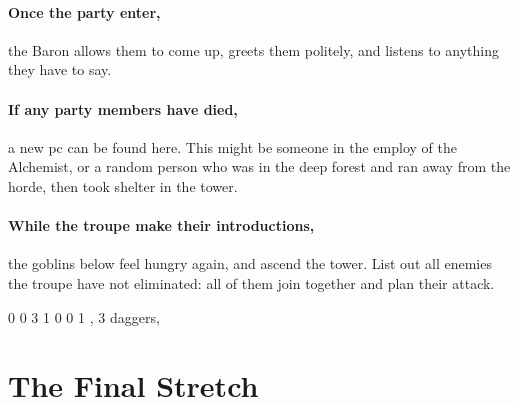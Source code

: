 \begin{multicols}{2}
\paragraph{Once the party enter,}
the Baron allows them to come up, greets them politely, and listens to anything they have to say.

\paragraph{If any party members have died,}
a new \gls{pc} can be found here.
This might be someone in the employ of the Alchemist, or a random person who was in the deep forest and ran away from the horde, then took shelter in the tower.

\paragraph{While the troupe make their introductions,}
the goblins below feel hungry again, and ascend the tower.
List out all enemies the troupe have not eliminated: all of them join together and plan their attack.

{0}%
{0}%
{{3}%
{1}%
{0}}%
{0}%
{1}%
{\setcounter{Projectiles}{1}\setcounter{Academics}{2}\setcounter{Crafts}{1}\setcounter{Deceit}{1}\setcounter{Medicine}{2}\setcounter{Vigilance}{1}}%
{\shortsword, 3 daggers, \partialleather}%
{
  \setcounter{Fire}{3}
  \setcounter{Air}{2}
  \setcounter{Earth}{1}
}

\showStdSpells

\end{multicols}

\section{The Final Stretch}


